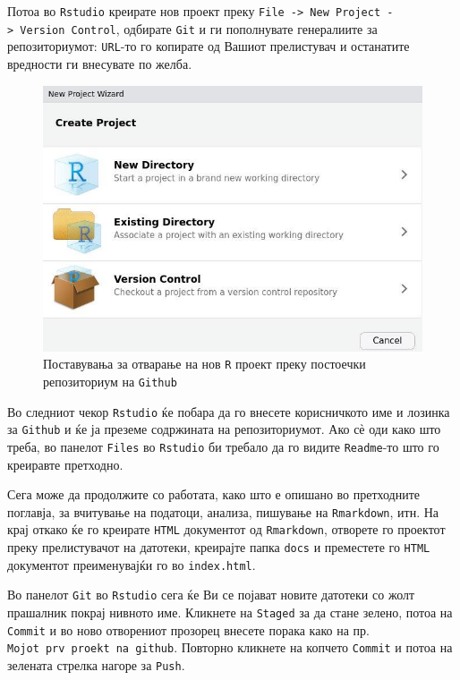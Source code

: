 \documentclass[
]{book}
\begin{document}
Потоа во \texttt{Rstudio} креирате нов проект преку \texttt{File\ -\textgreater{}\ New\ Project\ -\textgreater{}\ Version\ Control}, одбирате \texttt{Git} и ги пополнувате генералиите за репозиториумот: \texttt{URL}-то го копирате од Вашиот прелистувач и останатите вредности ги внесувате по желба.

\begin{figure}
\centering
\includegraphics{www/make-r-proj.jpg}
\caption{Поставувања за отварање на нов \texttt{R} проект преку постоечки репозиториум на \texttt{Github}}
\end{figure}

Во следниот чекор \texttt{Rstudio} ќе побара да го внесете корисничкото име и лозинка за \texttt{Github} и ќе ја преземе содржината на репозиториумот. Ако сѐ оди како што треба, во панелот \texttt{Files} во \texttt{Rstudio} би требало да го видите \texttt{Readme}-то што го креиравте претходно.

Сега може да продолжите со работата, како што е опишано во претходните поглавја, за вчитување на податоци, анализа, пишување на \texttt{Rmarkdown}, итн. На крај откако ќе го креирате \texttt{HTML} документот од \texttt{Rmarkdown}, отворете го проектот преку прелистувачот на датотеки, креирајте папка \texttt{docs} и преместете го \texttt{HTML} документот преименувајќи го во \texttt{index.html}.

Во панелот \texttt{Git} во \texttt{Rstudio} сега ќе Ви се појават новите датотеки со жолт прашалник покрај нивното име. Кликнете на \texttt{Staged} за да стане зелено, потоа на \texttt{Commit} и во ново отворениот прозорец внесете порака како на пр. \texttt{Mojot\ prv\ proekt\ na\ github}. Повторно кликнете на копчето \texttt{Commit} и потоа на зелената стрелка нагоре за \texttt{Push}.
\end{document}

